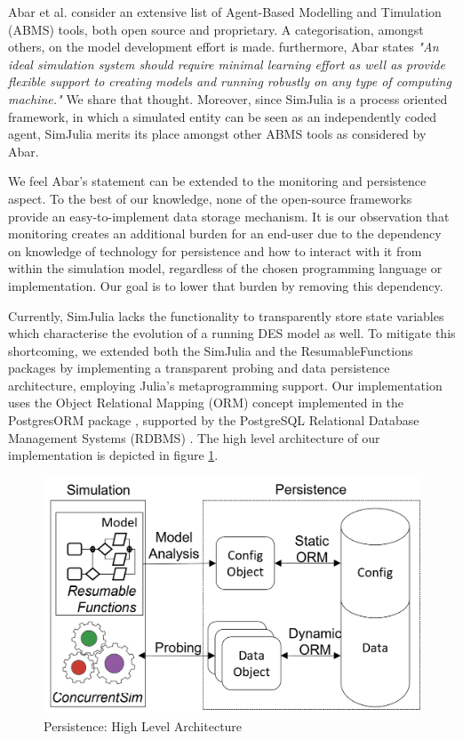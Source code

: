 \documentclass{juliacon}
\begin{document}
Abar et al. \cite{abar2017agent} consider an extensive list of Agent-Based Modelling and Timulation (ABMS) tools, both open source and proprietary. A categorisation, amongst others, on the model development effort is made. furthermore, Abar states \textit{"An ideal simulation system should require minimal learning effort as well as provide flexible support to creating models and running robustly on any type of computing machine."} We share that thought. Moreover, since SimJulia is a process oriented framework, in which a simulated entity can be seen as an independently coded agent, SimJulia merits its place amongst other ABMS tools as considered by Abar. \vskip 6pt

We feel Abar's statement can be extended to the monitoring and persistence aspect. To the best of our knowledge, none of the open-source frameworks provide an easy-to-implement data storage mechanism. It is our observation that monitoring creates an additional burden for an end-user due to the dependency on knowledge of technology for persistence and how to interact with it from within the simulation model, regardless of the chosen programming language or implementation. Our goal is to lower that burden by removing this dependency. \vskip 6pt

Currently, SimJulia lacks the functionality to transparently store state variables which characterise the evolution of a running DES model as well. To mitigate this shortcoming, we extended both the SimJulia and the ResumableFunctions \cite{lauwens2017resumablefunctions} packages by implementing a transparent probing and data persistence architecture, employing Julia's metaprogramming support. Our implementation uses the Object Relational Mapping (ORM) concept \cite{russell2008bridging} implemented in the PostgresORM package \cite{tecnivelPostgresORM}, supported by the PostgreSQL Relational Database Management Systems (RDBMS) \cite{psqldocs}. The high level architecture of our implementation is depicted in figure \ref{fig:highlevelarch}.

\begin{figure}[th]
	\centering
	\includegraphics[width=0.9\linewidth]{images/HighLevelArch}
	\caption{Persistence: High Level Architecture}
	\label{fig:highlevelarch}
\end{figure}
\end{document}
